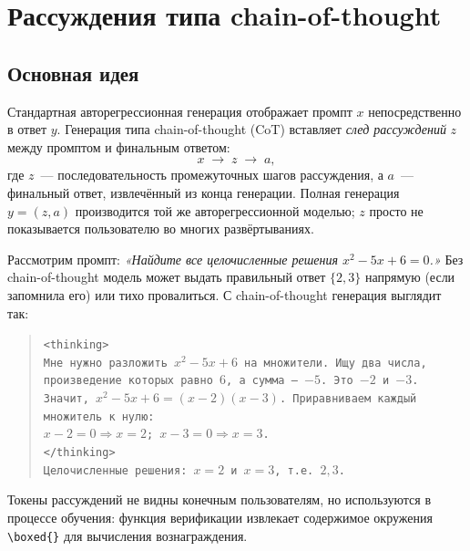 \section{Рассуждения типа chain-of-thought}
\label{sec:cot}

\subsection{Основная идея}

Стандартная авторегрессионная генерация отображает промпт $x$ непосредственно в
ответ $y$. Генерация типа chain-of-thought (CoT)
вставляет \emph{след рассуждений} $z$ между
промптом и финальным ответом:
\[
x \;\longrightarrow\; z \;\longrightarrow\; a,
\]
где $z$~--- последовательность промежуточных шагов рассуждения, а $a$~--- финальный
ответ, извлечённый из конца генерации. Полная
генерация $y = (z, a)$ производится той же авторегрессионной моделью;
$z$ просто не показывается пользователю во многих развёртываниях.

\begin{example}
\label{ex:cot-math}
Рассмотрим промпт: \emph{«Найдите все целочисленные решения
$x^2 - 5x + 6 = 0$.»} Без chain-of-thought модель может выдать
правильный ответ $\{2, 3\}$ напрямую (если запомнила его) или
тихо провалиться. С chain-of-thought генерация выглядит так:

\begin{quote}
\texttt{<thinking>}\\
\texttt{Мне нужно разложить $x^2 - 5x + 6$ на множители. Ищу два числа,}\\
\texttt{произведение которых равно $6$, а сумма~--- $-5$. Это $-2$ и $-3$.}\\
\texttt{Значит, $x^2 - 5x + 6 = (x-2)(x-3)$. Приравниваем каждый множитель к нулю:}\\
\texttt{$x - 2 = 0 \Rightarrow x = 2$; $x - 3 = 0 \Rightarrow x = 3$.}\\
\texttt{</thinking>}\\
\texttt{Целочисленные решения: $x = 2$ и $x = 3$, т.е. $\boxed{2, 3}$.}
\end{quote}

Токены рассуждений не видны конечным пользователям, но используются
в процессе обучения: функция верификации извлекает содержимое
окружения \texttt{\textbackslash boxed\{\}} для вычисления вознаграждения.
\end{example}

